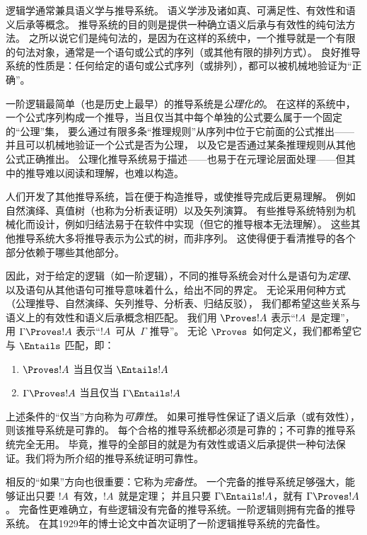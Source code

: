 \documentclass[../../../include/open-logic-section]{subfiles}
\begin{document}
      {}
      {}


逻辑学通常兼具语义学与推导系统。
语义学涉及诸如真、可满足性、有效性和语义后承等概念。
推导系统的目的则是提供一种确立语义后承与有效性的纯句法方法。
之所以说它们是纯句法的，是因为在这样的系统中，一个推导就是一个有限的句法对象，通常是一个语句或公式的序列（或其他有限的排列方式）。
良好推导系统的性质是：任何给定的语句或公式序列（或排列），都可以被机械地验证为“正确”。

一阶逻辑最简单（也是历史上最早）的推导系统是\emph{公理化的}。
在这样的系统中，一个公式序列构成一个推导，当且仅当其中每个单独的公式要么属于一个固定的“公理”集，
要么通过有限多条“推理规则”从序列中位于它前面的公式推出——并且可以机械地验证一个公式是否为公理，
以及它是否通过某条推理规则从其他公式正确推出。
公理化推导系统易于描述——也易于在元理论层面处理——但其中的推导难以阅读和理解，也难以构造。

人们开发了其他推导系统，旨在便于构造推导，或使推导完成后更易理解。
例如自然演绎、真值树（也称为分析表证明）以及矢列演算。
有些推导系统特别为机械化而设计，例如归结法易于在软件中实现（但它的推导根本无法理解）。
这些其他推导系统大多将推导表示为公式的树，而非序列。
这使得便于看清推导的各个部分依赖于哪些其他部分。

因此，对于给定的逻辑（如一阶逻辑），不同的推导系统会对什么是语句为\emph{定理}、
以及语句从其他语句可推导意味着什么，给出不同的界定。
无论采用何种方式（公理推导、自然演绎、矢列推导、分析表、归结反驳），
我们都希望这些关系与语义上的有效性和语义后承概念相匹配。
我们用 $\Proves !A$ 表示“$!A$~是定理”，用 $\Gamma \Proves !A$ 表示“$!A$~可从~$\Gamma$ 推导”。
无论 $\Proves$~如何定义，我们都希望它与 $\Entails$ 匹配，即：

\begin{enumerate}
\item $\Proves !A$ 当且仅当 $\Entails !A$
\item $\Gamma \Proves !A$ 当且仅当 $\Gamma \Entails !A$
\end{enumerate}

上述条件的“仅当”方向称为\emph{可靠性}。
如果可推导性保证了语义后承（或有效性），则该推导系统是可靠的。
每个合格的推导系统都必须是可靠的；不可靠的推导系统完全无用。
毕竟，推导的全部目的就是为有效性或语义后承提供一种句法保证。我们将为所介绍的推导系统证明可靠性。

相反的“如果”方向也很重要：它称为\emph{完备性}。
一个完备的推导系统足够强大，能够证出只要 $!A$~有效，$!A$~就是定理；
并且只要 $\Gamma \Entails !A$，就有 $\Gamma \Proves !A$。
完备性更难确立，有些逻辑没有完备的推导系统。一阶逻辑则拥有完备的推导系统。
在其1929年的博士论文中首次证明了一阶逻辑推导系统的完备性。
\end{document}
